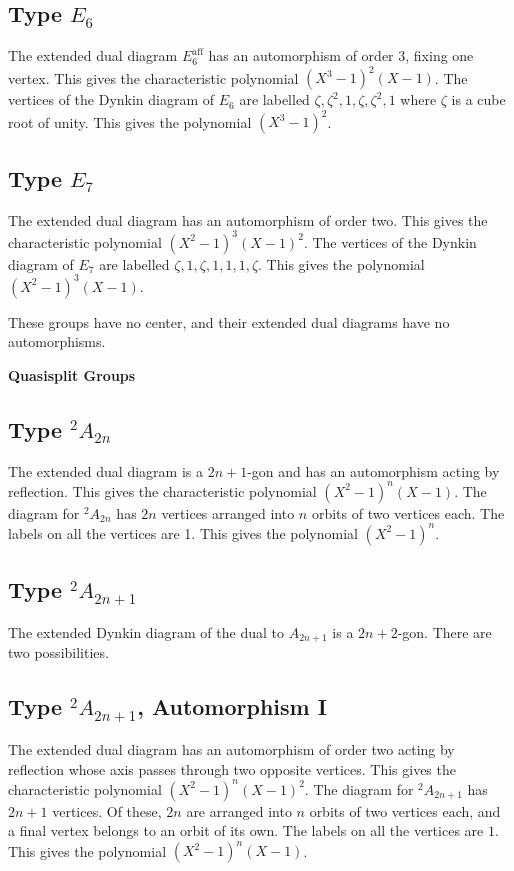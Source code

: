 \documentclass{amsart}
\def\aff{\operatorname{aff}}
\begin{document}
\subsection {Type $E_6$}
The extended dual
diagram $E_6^{\aff}$  has an automorphism of order 3, fixing one vertex.  This gives
the characteristic polynomial $(X^3-1)^2(X-1)$.  The vertices of the
Dynkin diagram of $E_6$ are labelled $\zeta,\zeta^2,1,\zeta,\zeta^2,1$
where $\zeta$ is a cube root of unity.  This gives the polynomial
$(X^3-1)^2$.

\subsection {Type $E_7$}
The extended dual
diagram has an automorphism of order two.  This gives the characteristic
polynomial $(X^2-1)^3(X-1)^2$.    The vertices of the Dynkin diagram of
$E_7$ are labelled $\zeta,1,\zeta,1,1,1,\zeta$.  This gives the
polynomial $(X^2-1)^3(X-1)$.

\quad
These groups have no center, and their extended dual diagrams have
no automorphisms.

\bigskip

\centerline{\bf Quasisplit Groups}

\subsection{Type ${}^2A_{2n}$}
The extended dual diagram is a $2n+1$-gon and 
has an automorphism acting by reflection.  This gives the
characteristic polynomial $(X^2-1)^n(X-1)$.   The diagram for ${}^2A_{2n}$
has $2n$ vertices arranged into $n$ orbits of two vertices each.  The
labels on all the vertices are 1.  This gives the polynomial
$(X^2-1)^n$.

\subsection{Type ${}^2A_{2n+1}$}
The extended Dynkin diagram of the dual to $A_{2n+1}$ is a $2n+2$-gon.
There are two possibilities.

\subsection{Type ${}^2A_{2n+1}$, Automorphism I}
The extended dual diagram has an automorphism of order two acting by
reflection whose axis passes through two opposite vertices.  This
gives the characteristic polynomial $(X^2-1)^n(X-1)^2$.    The diagram
for ${}^2A_{2n+1}$ has $2n+1$ vertices.  Of these, $2n$ are arranged
into $n$ orbits of two vertices each, and a final vertex belongs to
an orbit of its own.   The labels on all the vertices are $1$.  This
gives the polynomial $(X^2-1)^n(X-1)$.
\end{document}
